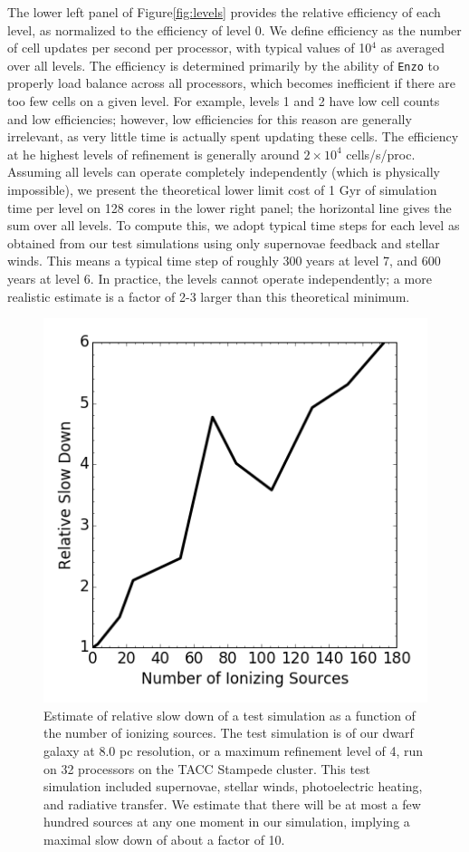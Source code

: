 \documentclass[11pt]{article}
\begin{document}
The lower left panel of Figure\ref{fig:levels} provides the relative efficiency of each level, as normalized to the efficiency of level 0. We define efficiency as the number of cell updates per second per processor, with typical values of 10$^4$ as averaged over all levels. The efficiency is determined primarily by the ability of \texttt{Enzo} to properly load balance across all processors, which becomes inefficient if there are too few cells on a given level. For example, levels 1 and 2 have low cell counts and low efficiencies; however, low efficiencies for this reason are generally irrelevant, as very little time is actually spent updating these cells. The efficiency at he highest levels of refinement is generally around $2\times 10^4$ cells/s/proc. Assuming all levels can operate completely independently (which is physically impossible), we present the theoretical lower limit cost of 1 Gyr of simulation time per level on 128 cores in the lower right panel; the horizontal line gives the sum over all levels. To compute this, we adopt typical time steps for each level as obtained from our test simulations using only supernovae feedback and stellar winds. This means a typical time step of roughly 300 years at level 7, and 600 years at level 6. In practice, the levels cannot operate independently; a more realistic estimate is a factor of 2-3 larger than this theoretical minimum.

\begin{figure}
\centering
\includegraphics[width=0.45\linewidth]{enzo_radiation}
\caption{Estimate of relative slow down of a test simulation as a function of the number of ionizing sources. The test simulation is of our dwarf galaxy at 8.0 pc resolution, or a maximum refinement level of 4, run on 32 processors on the TACC Stampede cluster. This test simulation included supernovae, stellar winds, photoelectric heating, and radiative transfer. We estimate that there will be at most a few hundred sources at any one moment in our simulation, implying a maximal slow down of about a factor of 10.}
\label{fig:radiation}
\end{figure}
\end{document}

